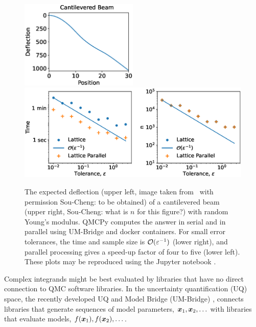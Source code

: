 \documentclass[graybox]{svmult}
\newcommand{\SCComment}[1]{{\color{green} Sou-Cheng: #1}}
\begin{document}
\begin{figure}[t]
    \centering 
    \includegraphics[width=0.5\textwidth]{cantileveredbeamwords.eps}
    \includegraphics[width=1\textwidth]{ldparallelbeam.eps}
    \caption{The expected deflection (upper left, image taken from~\cite{ParSee22a} with permission \SCComment{to be obtained}) of a cantilevered beam  (upper right, \SCComment{what is $n$ for this figure?}) with random Young's modulus.  QMCPy computes the answer in serial and in parallel using UM-Bridge and docker containers.  For small error tolerances, the time and sample size is ${\mathcal{O}}(\varepsilon^{-1})$ (lower right), and parallel processing gives a speed-up factor of four to five (lower left). These plots may be reproduced using the Jupyter notebook \cite{MCQMC2022Figs}.  }
    \label{CDHJSfigbeam}
\end{figure}


Complex integrands might be best evaluated by libraries that have no direct connection to QMC software libraries.  In the uncertainty quantification (UQ) space, the recently developed UQ and Model Bridge (UM-Bridge) \cite{umbridge}, connects libraries that generate sequences of model parameters, ${\boldsymbol{x}}_1, {\boldsymbol{x}}_2, \ldots$ with libraries that evaluate models, $f({\boldsymbol{x}}_1), f({\boldsymbol{x}}_2), \ldots$.  
\end{document}
